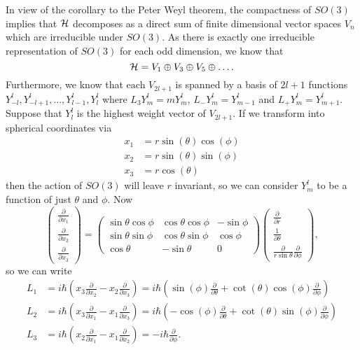 \documentclass[a4paper]{article}
\begin{document}
In view of the corollary to the Peter Weyl theorem, the compactness of $SO(3)$ implies that $\mathcal{H}$ decomposes as a direct sum of finite dimensional vector spaces $V_n$ which are irreducible under $SO(3)$. As there is exactly one irreducible representation of $SO(3)$ for each odd dimension, we know that 
$$\mathcal{H} = V_1 \oplus V_3 \oplus V_5 \oplus \hdots.$$
Furthermore, we know that each $V_{2l+1}$ is spanned by a basis of $2l+1$ functions $Y^l_{-l}, Y^l_{-l + 1}, \hdots, Y^l_{l-1}, Y^l_{l}$ where $L_3 Y^l_{m} = m Y^l_{m}$, $L_{-} Y^l_{m} = Y^l_{m-1}$ and $L_{+} Y^l_{m} = Y^l_{m+1}$. 
Suppose that $Y^l_{l}$ is the highest weight vector of $V_{2l+1}$. If we transform into spherical coordinates via
\begin{align*}
    x_1&=r\sin(\theta)\cos(\phi)\\
    x_2&=r\sin(\theta)\sin(\phi)\\
    x_3&=r\cos(\theta)
\end{align*}
then the action of $SO(3)$ will leave $r$ invariant, so we can consider $Y^l_{m}$ to be a function of just $\theta$ and $\phi$. Now 
$$\left(
    \begin{array}{c}
    \frac{\partial}{\partial x_{1}} \\
    \frac{\partial}{\partial x_{2}} \\
    \frac{\partial}{\partial x_{3}}
    \end{array}\right)=\left(\begin{array}{ccc}
    \sin \theta \cos \phi & \cos \theta \cos \phi & -\sin \phi \\
    \sin \theta \sin \phi & \cos \theta \sin \phi & \cos \phi \\
    \cos \theta & -\sin \theta & 0
    \end{array}\right)\left(\begin{array}{c}
    \frac{\partial}{\partial r} \\
    \frac{1}{\partial \theta} \\
    \frac{\partial}{r \sin \theta} \frac{\partial}{\partial \phi}
    \end{array}
\right),$$
so we can write 
\begin{align*}
    L_1 &= i\hbar\left(x_3\frac{\partial}{\partial x_2} - x_2\frac{\partial}{\partial x_3}\right) = i\hbar\left(\sin(\phi)\frac{\partial}{\partial \theta} + \cot(\theta)\cos(\phi)\frac{\partial}{\partial \phi}\right)\\
    L_2 &= i\hbar\left(x_3\frac{\partial}{\partial x_1} - x_1\frac{\partial}{\partial x_3}\right) = i\hbar\left(-\cos(\phi)\frac{\partial}{\partial \theta} + \cot(\theta)\sin(\phi)\frac{\partial}{\partial \phi}\right)\\
    L_3 &= i\hbar\left(x_2\frac{\partial}{\partial x_1} - x_1\frac{\partial}{\partial x_2}\right) = -i\hbar \frac{\partial}{\partial \phi}.
\end{align*}
\end{document}
